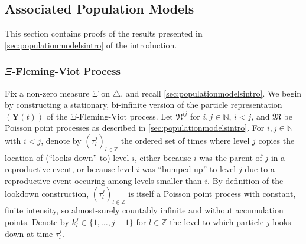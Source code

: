 \documentclass[reqno,draft]{amsart}
\numberwithin{equation}{section}
\theoremstyle{plain}
\theoremstyle{remark}
\newcommand{\R}{\mathbb{R}} %
\newcommand{\Z}{\mathbb{Z}} %
\newcommand{\N}{\mathbb{N}} %
\begin{document}
\subsection{Associated Population Models}

This section contains proofs of the results presented in \cref{sec:populationmodelsintro} of the introduction.

\subsubsection{$\Xi$-Fleming-Viot Process}\label{sec:prfxifv}

Fix a non-zero measure $\Xi$ on $\triangle$, and recall \cref{sec:populationmodelsintro}. We begin by constructing a stationary, bi-infinite version of the particle representation $(\boldsymbol Y(t))$ of the $\Xi$-Fleming-Viot process. Let $\mathfrak{N}^{ij}$ for $i,j\in \N$, $i < j$, and $\mathfrak{M}$ be Poisson point processes as described in \cref{sec:populationmodelsintro}.
For $i,j\in \N$ with $i < j$, denote by $(\tau^j_l)_{l\in \Z}$ the ordered set of times where level $j$ copies the location of (``looks down'' to) level $i$, either because $i$ was the parent of $j$ in a reproductive event, or because level $i$ was ``bumped up'' to level $j$ due to a reproductive event occuring among levels smaller than $i$. By definition of the lookdown construction, $(\tau^j_l)_{l\in \Z}$ is itself a Poisson point process with constant, finite intensity,
so almost-surely countably infinite and without accumulation points. Denote by $k^j_l \in \{1, \ldots ,j-1\}$ for $l\in \Z$ the level to which particle $j$ looks down at time $\tau^j_l$.

\end{document}
